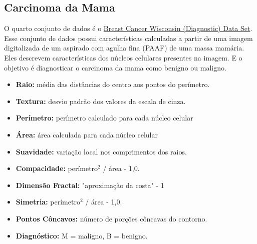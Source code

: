 \subsection{Carcinoma da Mama}
O quarto conjunto de dados é o \href{https://www.kaggle.com/datasets/uciml/breast-cancer-wisconsin-data}{Breast Cancer Wisconsin (Diagnostic) Data Set}. Esse conjunto de dados possui características calculadas a partir de uma imagem digitalizada de um aspirado com agulha fina (PAAF) de uma massa mamária. Eles descrevem características dos núcleos celulares presentes na imagem. E o objetivo é diagnosticar o carcinoma da mama como benigno ou maligno.
\begin{itemize}
    \item \textbf{Raio:} média das distâncias do centro aos pontos do perímetro.
    \item \textbf{Textura:} desvio padrão dos valores da escala de cinza.
    \item \textbf{Perímetro:} perímetro calculado para cada núcleo celular
    \item \textbf{Área:} área calculada para cada núcleo celular
    \item \textbf{Suavidade:} variação local nos comprimentos dos raios.
    \item \textbf{Compacidade:} perímetro$^2$ / área - 1,0.
    \item \textbf{Dimensão Fractal:} "aproximação da costa" - 1
    \item \textbf{Simetria:} perímetro$^2$ / área - 1,0.
    \item \textbf{Pontos Côncavos:} número de porções côncavas do contorno.
    \item \textbf{Diagnóstico:} M = maligno, B = benigno.
\end{itemize}

